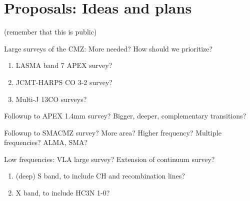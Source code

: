 \section{Proposals: Ideas and plans}
(remember that this is public)

Large surveys of the CMZ: More needed?  How should we prioritize?
\begin{enumerate}
\item LASMA band 7 APEX survey?
\item JCMT-HARPS CO 3-2 survey? 
\item Multi-J 13CO surveys?
\end{enumerate}

Followup to APEX 1.4mm survey?  Bigger, deeper, complementary transitions?

Followup to SMACMZ survey?  More area?  Higher frequency? Multiple frequencies?  ALMA, SMA? 

Low frequencies: VLA large survey?  Extension of \citet{Law2008b} continuum survey?
\begin{enumerate}
\item (deep) S band, to include CH and recombination lines?  
\item X band, to include HC3N 1-0?
\end{enumerate}